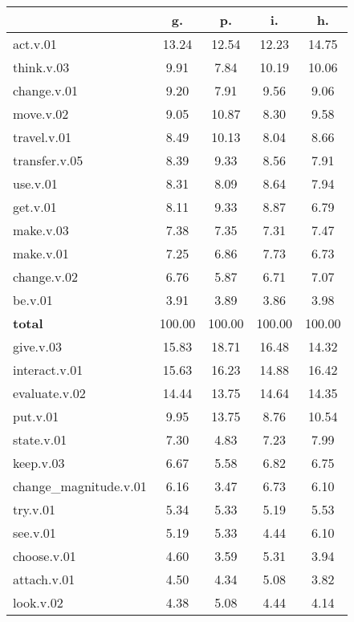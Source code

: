\begin{table}[h!]
\begin{center}
\begin{tabular}{| l || c | c | c | c |}\hline
 & {\bf g.} & {\bf p.} & {\bf i.} & {\bf h.} \\\hline\hline
act.v.01 & 13.24  & 12.54  & 12.23  & 14.75 \\\hline
think.v.03 & 9.91  & 7.84  & 10.19  & 10.06 \\\hline
change.v.01 & 9.20  & 7.91  & 9.56  & 9.06 \\\hline
move.v.02 & 9.05  & 10.87  & 8.30  & 9.58 \\\hline
travel.v.01 & 8.49  & 10.13  & 8.04  & 8.66 \\\hline
transfer.v.05 & 8.39  & 9.33  & 8.56  & 7.91 \\\hline
use.v.01 & 8.31  & 8.09  & 8.64  & 7.94 \\\hline
get.v.01 & 8.11  & 9.33  & 8.87  & 6.79 \\\hline
make.v.03 & 7.38  & 7.35  & 7.31  & 7.47 \\\hline
make.v.01 & 7.25  & 6.86  & 7.73  & 6.73 \\\hline
change.v.02 & 6.76  & 5.87  & 6.71  & 7.07 \\\hline
be.v.01 & 3.91  & 3.89  & 3.86  & 3.98 \\\hline\hline
{{\bf total}} & 100.00  & 100.00  & 100.00  & 100.00 \\\hline\hline\hline
give.v.03 & 15.83  & 18.71  & 16.48  & 14.32 \\\hline
interact.v.01 & 15.63  & 16.23  & 14.88  & 16.42 \\\hline
evaluate.v.02 & 14.44  & 13.75  & 14.64  & 14.35 \\\hline
put.v.01 & 9.95  & 13.75  & 8.76  & 10.54 \\\hline
state.v.01 & 7.30  & 4.83  & 7.23  & 7.99 \\\hline
keep.v.03 & 6.67  & 5.58  & 6.82  & 6.75 \\\hline
change\_magnitude.v.01 & 6.16  & 3.47  & 6.73  & 6.10 \\\hline
try.v.01 & 5.34  & 5.33  & 5.19  & 5.53 \\\hline
see.v.01 & 5.19  & 5.33  & 4.44  & 6.10 \\\hline
choose.v.01 & 4.60  & 3.59  & 5.31  & 3.94 \\\hline
attach.v.01 & 4.50  & 4.34  & 5.08  & 3.82 \\\hline
look.v.02 & 4.38  & 5.08  & 4.44  & 4.14 \\\hline\hline

\end{tabular}
\end{center}
\end{table}
